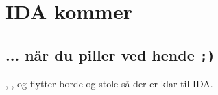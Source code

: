 
\section{IDA kommer}
\vspace{-3.35em}
\subsection*{\hspace{11.5em} ... når du piller ved hende {\tt ;)}}

\randildo, \farav, og \hemorides flytter borde og stole så der er klar til IDA.
